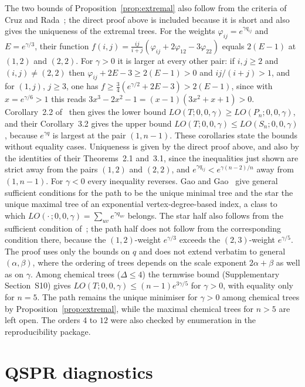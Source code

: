 \documentclass[a5paper, 10pt]{article}
\theoremstyle{plain}
\theoremstyle{remark}
\theoremstyle{definition}
\begin{document}
The two bounds of Proposition~\ref{prop:extremal} also follow from the criteria of Cruz and Rada~\cite{CruzRada2019PathStar}; the direct proof above is included because it is short and also gives the uniqueness of the extremal trees. For the weights $\varphi_{ij} = e^{\gamma q_{ij}}$ and $E = e^{\gamma/3}$, their function $f(i,j) = \tfrac{ij}{i+j}(\varphi_{ij} + 2\varphi_{12} - 3\varphi_{22})$ equals $2(E - 1)$ at $(1,2)$ and $(2,2)$. For $\gamma > 0$ it is larger at every other pair: if $i, j \ge 2$ and $(i,j) \ne (2,2)$ then $\varphi_{ij} + 2E - 3 \ge 2(E-1) > 0$ and $ij/(i+j) > 1$, and for $(1,j)$, $j \ge 3$, one has $f \ge \tfrac34(e^{\gamma/2} + 2E - 3) > 2(E-1)$, since with $x = e^{\gamma/6} > 1$ this reads $3x^3 - 2x^2 - 1 = (x-1)(3x^2 + x + 1) > 0$. Corollary~2.2 of~\cite{CruzRada2019PathStar} then gives the lower bound $LO(T;0,0,\gamma) \ge LO(P_n;0,0,\gamma)$, and their Corollary~3.2 gives the upper bound $LO(T;0,0,\gamma) \le LO(S_n;0,0,\gamma)$, because $e^{\gamma q}$ is largest at the pair $(1,n-1)$. These corollaries state the bounds without equality cases. Uniqueness is given by the direct proof above, and also by the identities of their Theorems~2.1 and~3.1, since the inequalities just shown are strict away from the pairs $(1,2)$ and $(2,2)$, and $e^{\gamma q_{ij}} < e^{\gamma(n-2)/n}$ away from $(1,n-1)$. For $\gamma < 0$ every inequality reverses. Gao and Gao~\cite{GaoAMC2024} give general sufficient conditions for the path to be the unique minimal tree and the star the unique maximal tree of an exponential vertex-degree-based index, a class to which $LO(\cdot\,;0,0,\gamma) = \sum_{uv} e^{\gamma q_{uv}}$ belongs. The star half also follows from the sufficient condition of~\cite[Section~4.2]{Rada2026LinearVDB}; the path half does not follow from the corresponding condition there, because the $(1,2)$-weight $e^{\gamma/3}$ exceeds the $(2,3)$-weight $e^{\gamma/5}$. The proof uses only the bounds on $q$ and does not extend verbatim to general $(\alpha,\beta)$, where the ordering of trees depends on the
scale exponent $2\alpha + \beta$ as well as on $\gamma$. Among
chemical trees ($\Delta \le 4$) the termwise bound (Supplementary Section~S10) gives
$LO(T;0,0,\gamma) \le (n-1)e^{3\gamma/5}$ for $\gamma > 0$, with
equality only for $n = 5$. The path remains the unique minimiser for $\gamma > 0$ among chemical trees by Proposition~\ref{prop:extremal}, while the maximal chemical trees for $n > 5$ are left open. The orders $4$ to $12$ were also checked by
enumeration in the reproducibility package.

\section{QSPR diagnostics}\label{sec:sensitivity}
\end{document}
